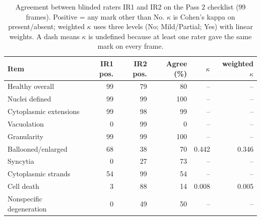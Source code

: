\begin{table}[!ht]
\centering
\caption{Agreement between blinded raters IR1 and IR2 on the Pass 2 checklist (99 frames). Positive = any mark other than No. $\kappa$ is Cohen's kappa on present/absent; weighted $\kappa$ uses three levels (No; Mild/Partial; Yes) with linear weights. A dash means $\kappa$ is undefined because at least one rater gave the same mark on every frame.}
\label{tab:agreement}
\begin{tabular}{lrrrrr}
\hline
Item & IR1 pos. & IR2 pos. & Agree (\%) & $\kappa$ & weighted $\kappa$ \\
\hline
Healthy overall & 99 & 79 & 80 & -- & -- \\
Nuclei defined & 99 & 99 & 100 & -- & -- \\
Cytoplasmic extensions & 99 & 98 & 99 & -- & -- \\
Vacuolation & 0 & 99 & 0 & -- & -- \\
Granularity & 99 & 99 & 100 & -- & -- \\
Ballooned/enlarged & 68 & 38 & 70 & 0.442 & 0.346 \\
Syncytia & 0 & 27 & 73 & -- & -- \\
Cytoplasmic strands & 54 & 99 & 54 & -- & -- \\
Cell death & 3 & 88 & 14 & 0.008 & 0.005 \\
Nonspecific degeneration & 0 & 49 & 50 & -- & -- \\
\hline
\end{tabular}
\end{table}
